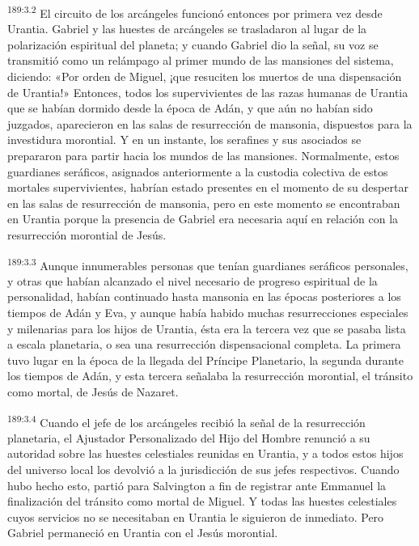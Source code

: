 \par 
\textsuperscript{189:3.2} El circuito de los arcángeles funcionó entonces por primera vez desde Urantia. Gabriel y las huestes de arcángeles se trasladaron al lugar de la polarización espiritual del planeta; y cuando Gabriel dio la señal, su voz se transmitió como un relámpago al primer mundo de las mansiones del sistema, diciendo: «Por orden de Miguel, ¡que resuciten los muertos de una dispensación de Urantia!» Entonces, todos los supervivientes de las razas humanas de Urantia que se habían dormido desde la época de Adán, y que aún no habían sido juzgados, aparecieron en las salas de resurrección de mansonia, dispuestos para la investidura morontial. Y en un instante, los serafines y sus asociados se prepararon para partir hacia los mundos de las mansiones. Normalmente, estos guardianes seráficos, asignados anteriormente a la custodia colectiva de estos mortales supervivientes, habrían estado presentes en el momento de su despertar en las salas de resurrección de mansonia, pero en este momento se encontraban en Urantia porque la presencia de Gabriel era necesaria aquí en relación con la resurrección morontial de Jesús.

\par 
\textsuperscript{189:3.3} Aunque innumerables personas que tenían guardianes seráficos personales, y otras que habían alcanzado el nivel necesario de progreso espiritual de la personalidad, habían continuado hasta mansonia en las épocas posteriores a los tiempos de Adán y Eva, y aunque había habido muchas resurrecciones especiales y milenarias para los hijos de Urantia, ésta era la tercera vez que se pasaba lista a escala planetaria, o sea una resurrección dispensacional completa. La primera tuvo lugar en la época de la llegada del Príncipe Planetario, la segunda durante los tiempos de Adán, y esta tercera señalaba la resurrección morontial, el tránsito como mortal, de Jesús de Nazaret.

\par 
\textsuperscript{189:3.4} Cuando el jefe de los arcángeles recibió la señal de la resurrección planetaria, el Ajustador Personalizado del Hijo del Hombre renunció a su autoridad sobre las huestes celestiales reunidas en Urantia, y a todos estos hijos del universo local los devolvió a la jurisdicción de sus jefes respectivos. Cuando hubo hecho esto, partió para Salvington a fin de registrar ante Emmanuel la finalización del tránsito como mortal de Miguel. Y todas las huestes celestiales cuyos servicios no se necesitaban en Urantia le siguieron de inmediato. Pero Gabriel permaneció en Urantia con el Jesús morontial.

